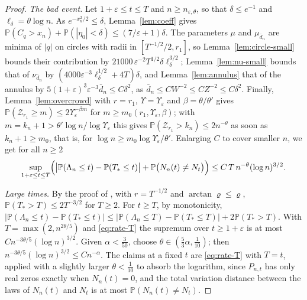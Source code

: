 \documentclass[11pt]{amsart}
\theoremstyle{definition}
\theoremstyle{remark}
\numberwithin{equation}{section}
\newcommand{\PP}{\mathbb{P}}
\newcommand{\eps}{\varepsilon}
\begin{document}
\begin{proof}
\emph{The bad event.} Let $1+\eps\le t\le T$ and $n\ge n_{\eps,\theta}$, so that $\delta\le e^{-1}$ and $\ell_\delta=\theta\log n$. As $e^{-x_n^2/2}\le\delta$, Lemma~\ref{lem:coeff} gives $\PP(C_q>x_n)+\PP(|\eta_0|<\delta)\le(7/\eps+1)\delta$. The parameters $\mu$ and $\mu_{\bar d_n}$ are minima of $|q|$ on circles with radii in $[T^{-1/2}/2,r_1]$, so Lemma~\ref{lem:circle-small} bounds their contribution by $21000\,\eps^{-2}T^{1/2}\delta\ell_\delta^{3/2}$; Lemma~\ref{lem:nu-small} bounds that of $\nu_{\bar d_n}$ by $(4000\eps^{-3}\ell_\delta^{1/2}+4T)\delta$, and Lemma~\ref{lem:annulus} that of the annulus by $5(1+\eps)^3\eps^{-3}\bar d_n\le C\delta^2$, as $\bar d_n\le CW^{-2}\le CZ^{-2}\le C\delta^2$. Finally, Lemma~\ref{lem:overcrowd} with $r=r_1$, $\Upsilon=\Upsilon_\eps$ and $\beta=\theta/\theta'$ gives $\PP(\mathcal Z_{r_1}\ge m)\le2\Upsilon_\eps^{-\beta m}$ for $m\ge m_0(r_1,\Upsilon_\eps,\beta)$; with $m=k_n+1>\theta'\log n/\log\Upsilon_\eps$ this gives $\PP(\mathcal Z_{r_1}>k_n)\le2n^{-\theta}$ as soon as $k_n+1\ge m_0$, that is, for $\log n\ge m_0\log\Upsilon_\eps/\theta'$. Enlarging $C$ to cover smaller $n$, we get for all $n\ge2$
\begin{equation}\label{eq:rate-T}
\sup_{1+\eps\le t\le T}\Bigl(\bigl|\PP(\Lambda_n\le t)-\PP(T_*\le t)\bigr|+\PP\bigl(N_n(t)\ne N_t\bigr)\Bigr)\le C\,T\,n^{-\theta}(\log n)^{3/2}.
\end{equation}

\emph{Large times.} By the proof of \cite[Lemma~\ref{M-lem:pairs}]{Main}, with $r=T^{-1/2}$ and $\arctan\varrho\le\varrho$, $\PP(T_*>T)\le2T^{-3/2}$ for $T\ge2$. For $t\ge T$, by monotonicity, $|\PP(\Lambda_n\le t)-\PP(T_*\le t)|\le|\PP(\Lambda_n\le T)-\PP(T_*\le T)|+2\PP(T_*>T)$. With $T=\max(2,n^{2\theta/5})$ and \eqref{eq:rate-T} the supremum over $t\ge1+\eps$ is at most $Cn^{-3\theta/5}(\log n)^{3/2}$. Given $\alpha<\frac3{50}$, choose $\theta\in(\frac53\alpha,\frac1{10})$; then $n^{-3\theta/5}(\log n)^{3/2}\le Cn^{-\alpha}$. The claims at a fixed $t$ are \eqref{eq:rate-T} with $T=t$, applied with a slightly larger $\theta<\frac1{10}$ to absorb the logarithm, since $P_{n,t}$ has only real zeros exactly when $N_n(t)=0$, and the total variation distance between the laws of $N_n(t)$ and $N_t$ is at most $\PP(N_n(t)\ne N_t)$.
\end{proof}
\end{document}
